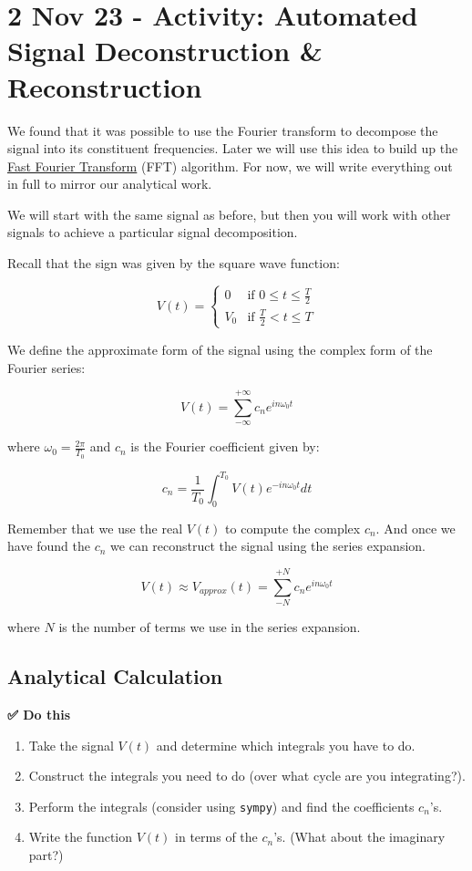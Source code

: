 \section{2 Nov 23 - Activity: Automated Signal Deconstruction \&
Reconstruction}\label{nov-23---activity-automated-signal-deconstruction-reconstruction}

We found that it was possible to use the Fourier transform to decompose
the signal into its constituent frequencies. Later we will use this idea
to build up the
\href{https://en.wikipedia.org/wiki/Fast_Fourier_transform}{Fast Fourier
Transform} (FFT) algorithm. For now, we will write everything out in
full to mirror our analytical work.

We will start with the same signal as before, but then you will work
with other signals to achieve a particular signal decomposition.

Recall that the sign was given by the square wave function:

\[V(t) = \begin{cases} 0 & \text{if } 0 \leq t \leq \frac{T}{2} \\ V_0 & \text{if } \frac{T}{2} < t \leq T \end{cases}\]

We define the approximate form of the signal using the complex form of
the Fourier series:

\[V(t) = \sum_{-\infty}^{+\infty} c_n e^{i n \omega_0 t}\]

where \(\omega_0 = \frac{2 \pi}{T_0}\) and \(c_n\) is the Fourier
coefficient given by:

\[c_n = \frac{1}{T_0} \int_{0}^{T_0} V(t) e^{-i n \omega_0 t} dt\]

Remember that we use the real \(V(t)\) to compute the complex \(c_n\).
And once we have found the \(c_n\) we can reconstruct the signal using
the series expansion.

\[V(t) \approx V_{approx}(t) = \sum_{-N}^{+N} c_n e^{i n \omega_0 t}\]

where \(N\) is the number of terms we use in the series expansion.

\subsection{Analytical Calculation}\label{analytical-calculation}

\textbf{✅ Do this}

\begin{enumerate}
\def\labelenumi{\arabic{enumi}.}
\tightlist
\item
  Take the signal \(V(t)\) and determine which integrals you have to do.
\item
  Construct the integrals you need to do (over what cycle are you
  integrating?).
\item
  Perform the integrals (consider using \texttt{sympy}) and find the
  coefficients \(c_n\)'s.
\item
  Write the function \(V(t)\) in terms of the \(c_n\)'s. (What about the
  imaginary part?)
\end{enumerate}

